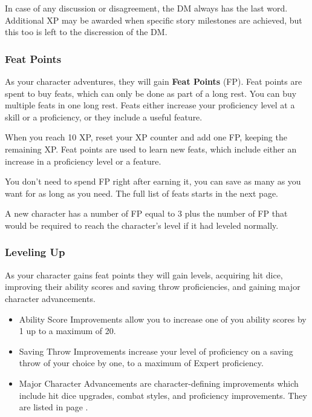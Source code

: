    In case of any discussion or disagreement, the DM always has the last word.
    Additional XP may be awarded when specific story milestones are achieved, but this too is left to the discression of the DM.

    \newpage

\subsubsection{Feat Points}
    As your character adventures, they will gain \textbf{Feat Points} (FP).
    Feat points are spent to buy feats, which can only be done as part of a long rest.
    You can buy multiple feats in one long rest.
    Feats either increase your proficiency level at a skill or a proficiency, or they include a useful feature.

    When you reach 10 XP, reset your XP counter and add one FP, keeping the remaining XP.
    Feat points are used to learn new feats, which include either an increase in a proficiency level or a feature.

    You don't need to spend FP right after earning it, you can save as many as you want for as long as you need.
    The full list of feats starts in the next page.

    A new character has a number of FP equal to 3 plus the number of FP that would be required to reach the character's level if it had leveled normally.

\subsubsection{Leveling Up}
    As your character gains feat points they will gain levels, acquiring hit dice, improving their ability scores and saving throw proficiencies, and gaining major character advancements.
    \begin{itemize}
        \item Ability Score Improvements allow you to increase one of you ability scores by 1 up to a maximum of 20.
        \item Saving Throw Improvements increase your level of proficiency on a saving throw of your choice by one, to a maximum of Expert proficiency.
        \item Major Character Advancements are character-defining improvements which include hit dice upgrades, combat styles, and proficiency improvements.
        They are listed in page \pageref{sec::majorcharacteradvancement}.
    \end{itemize}


    \newpage
